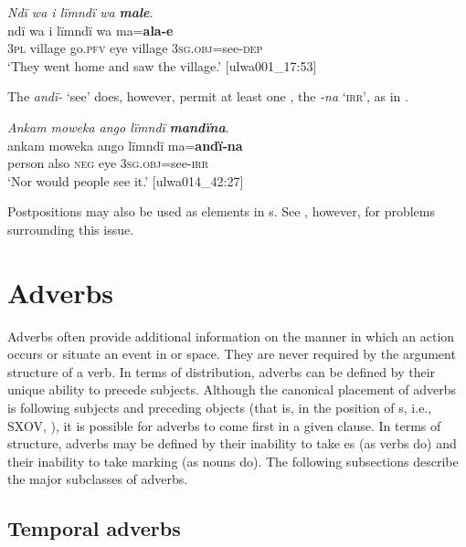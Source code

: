 \ea%
    \label{ex:otherwc:32}
          \textit{Ndï wa i lïmndï wa} \textbf{\textit{male}}.\\
\gll ndï  wa    i    lïmndï  wa    ma=\textbf{ala-e}\\
    3\textsc{pl}  village  go.\textsc{pfv}  eye    village  \textsc{3sg.obj}=see-\textsc{dep}\\
\glt `They went home and saw the village.’ [ulwa001\_17:53]
\z

The  \textit{andï-} ‘see’ does, however, permit at least one  , the   \textit{-na} ‘\textsc{irr}’, as in .

\ea%
    \label{ex:otherwc:33}
          \textit{Ankam moweka ango lïmndï} \textbf{\textit{mandïna}}.\\
\gll ankam  moweka  ango  lïmndï  ma=\textbf{andï-na}\\
    person  also    \textsc{neg}  eye    \textsc{3sg.obj}=see-\textsc{irr}\\
\glt `Nor would people see it.’ [ulwa014\_42:27]
\z

Postpositions may also be used as elements in s. See , however, for problems surrounding this issue.


\section{Adverbs}\label{sec:8.2}


Adverbs often provide additional information on the manner in which an action occurs or situate an event in  or space. They are never required by the argument structure of a verb. In terms of distribution, adverbs can be defined by their unique ability to precede subjects. Although the canonical placement of adverbs is following subjects and preceding objects (that is, in the position of s, i.e., SXOV, ), it is possible for adverbs to come first in a given clause. In terms of structure, adverbs may be defined by their inability to take  es (as verbs do) and their inability to take  marking (as nouns do). The following subsections describe the major subclasses of adverbs.


\subsection{Temporal adverbs}\label{sec:8.2.1}

